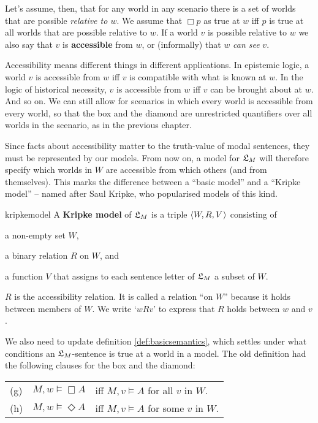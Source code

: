 Let's assume, then, that for any world in any scenario there is a set of worlds
that are possible \emph{relative to $w$}. We assume that $\Box p$ as true at $w$
iff $p$ is true at all worlds that are possible relative to $w$. If a world $v$
is possible relative to $w$ we also say that $v$ is \textbf{accessible} from $w$,
or (informally) that $w$ \emph{can see} $v$.

Accessibility means different things in different applications. In epistemic
logic, a world $v$ is accessible from $w$ iff $v$ is compatible with what is
known at $w$. In the logic of historical necessity, $v$ is accessible from $w$
iff $v$ can be brought about at $w$. And so on. We can still allow for scenarios
in which every world is accessible from every world, so that the box and the
diamond are unrestricted quantifiers over all worlds in the scenario, as in the
previous chapter.

Since facts about accessibility matter to the truth-value of modal sentences,
they must be represented by our models. From now on, a model for $\mathfrak{L}_M$ will
therefore specify which worlds in $W$ are accessible from which others (and from
themselves). This marks the difference between a ``basic model'' and a ``Kripke
model'' -- named after Saul Kripke, who popularised models of this kind.
%
% 
\begin{definition}{}{kripkemodel}
  A \textbf{Kripke model} of $\mathfrak{L}_M$ is a triple $\t{W,R,V}$ consisting of
  \vspace{-3mm}
  \begin{itemize*}
  \item a non-empty set $W$,
  \item a binary relation $R$ on $W$, and
  \item a function $V$ that assigns to each sentence letter of $\mathfrak{L}_M$
  a subset of $W$.
  \end{itemize*}
\end{definition}
%
\noindent%
$R$ is the accessibility relation. It is called a relation ``on $W$'' because it
holds between members of $W$. We write `$wRv$' to express that $R$ holds between
$w$ and $v$.

We also need to update definition \ref{def:basicsemantics}, which settles under
what conditions an $\mathfrak{L}_M$-sentence is true at a world in a model. The old
definition had the following clauses for the box and the diamond:

\bigskip
\begin{tabular}{lll}
  (g) & $M,w \models \Box A$ &iff $M,v \models A$ for all $v$ in $ W$.\\
  (h) & $M,w \models \Diamond A$ &iff $M,v \models A$ for some $v$ in $ W$.
\end{tabular}
\bigskip

